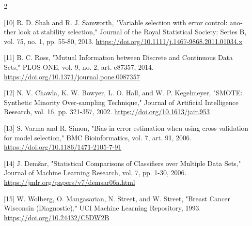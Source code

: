 \documentclass[10pt,a4paper]{article}
\begin{document}
\begin{multicols}{2}
\begin{minipage}{\linewidth}{\fontsize{7}{8.2}\selectfont \begin{latin}[10] R. D. Shah and R. J. Samworth, "Variable selection with error control: another look at stability selection," Journal of the Royal Statistical Society: Series B, vol. 75, no. 1, pp. 55-80, 2013. \url{https://doi.org/10.1111/j.1467-9868.2011.01034.x}\end{latin}\par}\end{minipage}\par
\begin{minipage}{\linewidth}{\fontsize{7}{8.2}\selectfont \begin{latin}[11] B. C. Ross, "Mutual Information between Discrete and Continuous Data Sets," PLOS ONE, vol. 9, no. 2, art. e87357, 2014. \url{https://doi.org/10.1371/journal.pone.0087357}\end{latin}\par}\end{minipage}\par
\begin{minipage}{\linewidth}{\fontsize{7}{8.2}\selectfont \begin{latin}[12] N. V. Chawla, K. W. Bowyer, L. O. Hall, and W. P. Kegelmeyer, "SMOTE: Synthetic Minority Over-sampling Technique," Journal of Artificial Intelligence Research, vol. 16, pp. 321-357, 2002. \url{https://doi.org/10.1613/jair.953}\end{latin}\par}\end{minipage}\par
\begin{minipage}{\linewidth}{\fontsize{7}{8.2}\selectfont \begin{latin}[13] S. Varma and R. Simon, "Bias in error estimation when using cross-validation for model selection," BMC Bioinformatics, vol. 7, art. 91, 2006. \url{https://doi.org/10.1186/1471-2105-7-91}\end{latin}\par}\end{minipage}\par
\begin{minipage}{\linewidth}{\fontsize{7}{8.2}\selectfont \begin{latin}[14] J. Demšar, "Statistical Comparisons of Classifiers over Multiple Data Sets," Journal of Machine Learning Research, vol. 7, pp. 1-30, 2006. \url{https://jmlr.org/papers/v7/demsar06a.html}\end{latin}\par}\end{minipage}\par
\begin{minipage}{\linewidth}{\fontsize{7}{8.2}\selectfont \begin{latin}[15] W. Wolberg, O. Mangasarian, N. Street, and W. Street, "Breast Cancer Wisconsin (Diagnostic)," UCI Machine Learning Repository, 1993. \url{https://doi.org/10.24432/C5DW2B}\end{latin}\par}\end{minipage}\par
\end{multicols}
\end{document}
